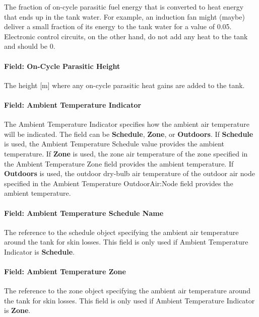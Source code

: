 The fraction of on-cycle parasitic fuel energy that is converted to heat energy that ends up in the tank water. For example, an induction fan might (maybe) deliver a small fraction of its energy to the tank water for a value of 0.05. Electronic control circuits, on the other hand, do not add any heat to the tank and should be 0.

\paragraph{Field: On-Cycle Parasitic Height}\label{field-on-cycle-parasitic-height}

The height {[}m{]} where any on-cycle parasitic heat gains are added to the tank.

\paragraph{Field: Ambient Temperature Indicator}\label{field-ambient-temperature-indicator-1-000}

The Ambient Temperature Indicator specifies how the ambient air temperature will be indicated. The field can be \textbf{Schedule}, \textbf{Zone}, or \textbf{Outdoors}. If \textbf{Schedule} is used, the Ambient Temperature Schedule value provides the ambient temperature. If \textbf{Zone} is used, the zone air temperature of the zone specified in the Ambient Temperature Zone field provides the ambient temperature. If \textbf{Outdoors} is used, the outdoor dry-bulb air temperature of the outdoor air node specified in the Ambient Temperature OutdoorAir:Node field provides the ambient temperature.

\paragraph{Field: Ambient Temperature Schedule Name}\label{field-ambient-temperature-schedule-name-1-000}

The reference to the schedule object specifying the ambient air temperature around the tank for skin losses. This field is only used if Ambient Temperature Indicator is \textbf{Schedule}.

\paragraph{Field: Ambient Temperature Zone}\label{field-ambient-temperature-zone}

The reference to the zone object specifying the ambient air temperature around the tank for skin losses. This field is only used if Ambient Temperature Indicator is \textbf{Zone}.

